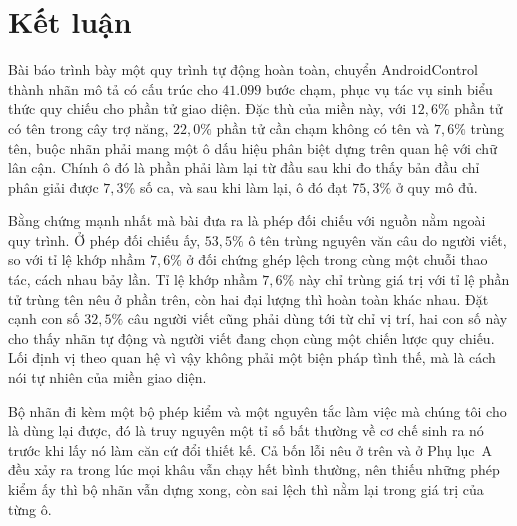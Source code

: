 \documentclass[12pt,a4paper,onecolumn]{article}
\newcommand{\ôvuông}[2]{\tikz[baseline=-0.45ex]{\draw[#1,line width=0.9pt,#2] (0,0) rectangle (0.34,0.18);}}
\begin{document}
\section{Kết luận}

Bài báo trình bày một quy trình tự động hoàn toàn, chuyển AndroidControl thành nhãn mô tả
có cấu trúc cho $41.099$ bước chạm, phục vụ tác vụ sinh biểu thức quy chiếu cho phần tử
giao diện. Đặc thù của miền này, với $12{,}6\%$ phần tử có tên trong cây trợ năng,
$22{,}0\%$ phần tử cần chạm không có tên và $7{,}6\%$ trùng tên, buộc nhãn phải mang một ô dấu
hiệu phân biệt dựng trên quan hệ với chữ lân cận. Chính ô đó là phần phải làm lại từ đầu
sau khi đo thấy bản đầu chỉ phân giải được $7{,}3\%$ số ca, và sau khi làm lại, ô đó đạt $75{,}3\%$ ở quy mô đủ.

Bằng chứng mạnh nhất mà bài đưa ra là phép đối chiếu với nguồn nằm ngoài quy trình. Ở
phép đối chiếu ấy, $53{,}5\%$ ô tên trùng nguyên văn câu do người viết, so với tỉ lệ khớp
nhầm $7{,}6\%$ ở đối chứng ghép lệch trong cùng một chuỗi thao tác,
cách nhau bảy lần.
Tỉ lệ khớp nhầm $7{,}6\%$ này chỉ trùng giá trị với tỉ lệ phần tử trùng tên nêu ở phần
trên, còn hai đại lượng thì hoàn toàn khác nhau. Đặt cạnh con số $32{,}5\%$ câu người viết cũng phải dùng tới từ chỉ vị trí, hai con số này cho thấy nhãn tự động và người
viết đang chọn cùng một chiến lược quy chiếu. Lối định vị theo quan hệ vì vậy không phải
một biện pháp tình thế, mà là cách nói tự nhiên của miền giao diện.

Bộ nhãn đi kèm một bộ phép kiểm và một nguyên tắc làm việc mà chúng tôi cho là dùng lại được, đó là truy nguyên một tỉ số
bất thường về cơ chế sinh ra nó trước khi lấy nó làm căn cứ đổi thiết kế. Cả bốn lỗi nêu ở trên và ở Phụ lục~A đều xảy ra trong lúc mọi khâu vẫn chạy hết bình
thường, nên thiếu những phép kiểm ấy thì bộ nhãn vẫn dựng xong, còn sai lệch thì nằm lại
trong giá trị của từng ô.

\titleformat{\section}[block]{\normalsize\bfseries\centering}{}{0pt}{}
\end{document}
